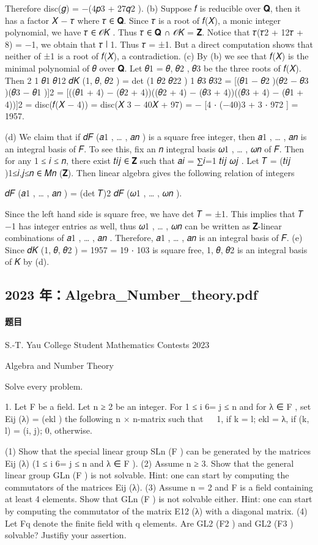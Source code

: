 \documentclass[UTF8,12pt]{ctexart}
\begin{document}
Therefore disc(𝑔) = −(4𝑝3 + 27𝑞2 ). (b) Suppose 𝑓 is reducible over 𝐐, then it has a factor 𝑋 − 𝜏 where 𝜏 ∈ 𝐐. Since 𝜏 is a root of 𝑓(𝑋), a monic integer polynomial, we have 𝜏 ∈ 𝒪𝐾 . Thus 𝜏 ∈ 𝐐 ∩ 𝒪𝐾 = 𝐙. Notice that 𝜏(𝜏2 + 12𝜏 + 8) = −1, we obtain that 𝜏 ∣ 1. Thus 𝜏 = ±1. But a direct computation shows that neither of ±1 is a root of 𝑓(𝑋), a contradiction. (c) By (b) we see that 𝑓(𝑋) is the minimal polynomial of 𝜃 over 𝐐. Let 𝜃1 = 𝜃, 𝜃2 , 𝜃3 be the three roots of 𝑓(𝑋). Then 2 1 𝜃1 𝜃12 𝑑𝐾 (1, 𝜃, 𝜃2 ) = det (1 𝜃2 𝜃22 ) 1 𝜃3 𝜃32 = [(𝜃1 − 𝜃2 )(𝜃2 − 𝜃3 )(𝜃3 − 𝜃1 )]2 = [((𝜃1 + 4) − (𝜃2 + 4))((𝜃2 + 4) − (𝜃3 + 4))((𝜃3 + 4) − (𝜃1 + 4))]2 = disc(𝑓(𝑋 − 4)) = disc(𝑋 3 − 40𝑋 + 97) = − [4 ⋅ (−40)3 + 3 ⋅ 972 ] = 1957.

(d) We claim that if 𝑑𝐹 (𝑎1 , … , 𝑎𝑛 ) is a square free integer, then 𝑎1 , … , 𝑎𝑛 is an integral basis of 𝐹. To see this, fix an 𝑛 integral basis 𝜔1 , … , 𝜔𝑛 of 𝐹. Then for any 1 ≤ 𝑖 ≤ 𝑛, there exist 𝑡𝑖𝑗 ∈ 𝐙 such that 𝑎𝑖 = ∑𝑖=1 𝑡𝑖𝑗 𝜔𝑗 . Let 𝑇 = (𝑡𝑖𝑗 )1≤𝑖,𝑗≤𝑛 ∈ 𝑀𝑛 (𝐙). Then linear algebra gives the following relation of integers

𝑑𝐹 (𝑎1 , … , 𝑎𝑛 ) = (det 𝑇)2 𝑑𝐹 (𝜔1 , … , 𝜔𝑛 ).

Since the left hand side is square free, we have det 𝑇 = ±1. This implies that 𝑇 −1 has integer entries as well, thus 𝜔1 , … , 𝜔𝑛 can be written as 𝐙-linear combinations of 𝑎1 , … , 𝑎𝑛 . Therefore, 𝑎1 , … , 𝑎𝑛 is an integral basis of 𝐹. (e) Since 𝑑𝐾 (1, 𝜃, 𝜃2 ) = 1957 = 19 ⋅ 103 is square free, 1, 𝜃, 𝜃2 is an integral basis of 𝐾 by (d).

\subsection{2023 年：Algebra\_Number\_theory.pdf}
\paragraph{题目}
S.-T. Yau College Student Mathematics Contests 2023

Algebra and Number Theory

Solve every problem.

1. Let F be a field. Let n ≥ 2 be an integer. For 1 ≤ i 6= j ≤ n and for λ ∈ F , set Eij (λ) = (ekl ) the following n × n-matrix such that   1, if k = l; ekl = λ, if (k, l) = (i, j); 0, otherwise. 

(1) Show that the special linear group SLn (F ) can be generated by the matrices Eij (λ) (1 ≤ i 6= j ≤ n and λ ∈ F ). (2) Assume n ≥ 3. Show that the general linear group GLn (F ) is not solvable. Hint: one can start by computing the commutators of the matrices Eij (λ). (3) Assume n = 2 and F is a field containing at least 4 elements. Show that GLn (F ) is not solvable either. Hint: one can start by computing the commutator of the matrix E12 (λ) with a diagonal matrix. (4) Let Fq denote the finite field with q elements. Are GL2 (F2 ) and GL2 (F3 ) solvable? Justifiy your assertion.
\end{document}
